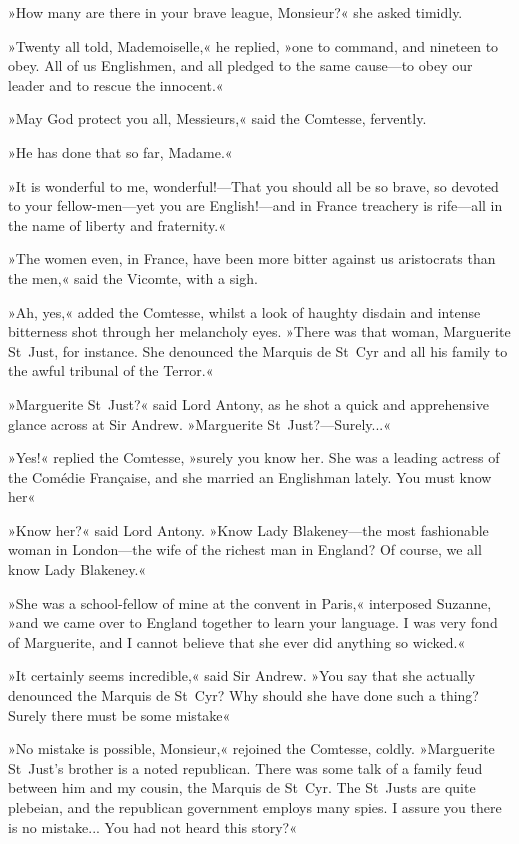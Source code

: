 »How many are there in your brave league, Monsieur?« she asked timidly.

»Twenty all told, Mademoiselle,« he replied, »one to command, and nineteen to obey. All of us Englishmen, and all pledged to the same cause\allowbreak---\allowbreak to obey our leader and to rescue the innocent.«

»May God protect you all, Messieurs,« said the Comtesse, fervently.

»He has done that so far, Madame.«

»It is wonderful to me, wonderful!\allowbreak---\allowbreak That you should all be so brave, so devoted to your fellow-men\allowbreak---\allowbreak yet you are English!\allowbreak---\allowbreak and in France treachery is rife\allowbreak---\allowbreak all in the name of liberty and fraternity.«

»The women even, in France, have been more bitter against us aristocrats than the men,« said the Vicomte, with a sigh.

»Ah, yes,« added the Comtesse, whilst a look of haughty disdain and intense bitterness shot through her melancholy eyes. »There was that woman, Marguerite St~Just, for instance. She denounced the Marquis de St~Cyr and all his family to the awful tribunal of the Terror.«

»Marguerite St~Just?« said Lord Antony, as he shot a quick and apprehensive glance across at Sir Andrew. »Marguerite St~Just?\allowbreak---\allowbreak  Surely...«

»Yes!« replied the Comtesse, »surely you know her. She was a leading actress of the Comédie Française, and she married an Englishman lately. You must know her\longdash«

»Know her?« said Lord Antony. »Know Lady Blakeney\allowbreak---\allowbreak the most fashionable woman in London\allowbreak---\allowbreak the wife of the richest man in England? Of course, we all know Lady Blakeney.«

»She was a school-fellow of mine at the convent in Paris,« interposed Suzanne, »and we came over to England together to learn your language. I was very fond of Marguerite, and I cannot believe that she ever did anything so wicked.«

»It certainly seems incredible,« said Sir Andrew. »You say that she actually denounced the Marquis de St~Cyr? Why should she have done such a thing? Surely there must be some mistake\longdash«

»No mistake is possible, Monsieur,« rejoined the Comtesse, coldly. »Marguerite St~Just's brother is a noted republican. There was some talk of a family feud between him and my cousin, the Marquis de St~Cyr. The St~Justs are quite plebeian, and the republican government employs many spies. I assure you there is no mistake... You had not heard this story?«

